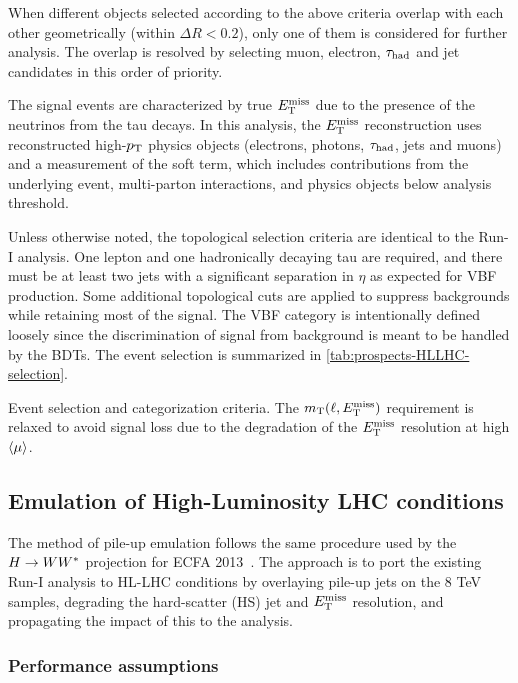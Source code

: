 When different objects selected according to the above criteria overlap with each other geometrically (within $\Delta R < 0.2$), only one of them is considered for further analysis. The overlap is resolved by selecting muon, electron, $\tau_\text{had}$ and jet candidates in this order of priority.

The signal events are characterized by true $E_{\mathrm{T}}^{\mathrm{miss}}$ due to the presence of the neutrinos from the tau decays. In this analysis, the $E_{\mathrm{T}}^{\mathrm{miss}}$ reconstruction uses reconstructed high-$p_{\mathrm{T}}$ physics objects (electrons, photons, $\tau_\text{had}$, jets and muons) and a measurement of the soft term, which includes contributions from the underlying event, multi-parton interactions, and physics objects below analysis threshold.

Unless otherwise noted, the topological selection criteria are identical to the Run-I analysis. One lepton and one hadronically decaying tau are required, and there must be at least two jets with a significant separation in $\eta$ as expected for VBF production. Some additional topological cuts are applied to suppress backgrounds while retaining most of the signal. The VBF category is intentionally defined loosely since the discrimination of signal from background is meant to be handled by the BDTs. The event selection is summarized in \cref{tab:prospects-HLLHC-selection}.

\begin{table}[!htpb]
  \centering
  \renewcommand{\arraystretch}{1.4}
  \caption{Event selection and categorization criteria. The $m_\text{T}(\ell, E_{\mathrm{T}}^{\mathrm{miss}})$ requirement is relaxed to avoid signal loss due to the degradation of the $E_{\mathrm{T}}^{\mathrm{miss}}$ resolution at high $\langle\mu\rangle$.}
  
  \label{tab:prospects-HLLHC-selection}
\end{table}

\subsection{Emulation of High-Luminosity LHC conditions}

The method of pile-up emulation follows the same procedure used by the $H\rightarrow WW^\ast$ projection for ECFA 2013~\cite{ATL-PHYS-PUB-2013-014}. The approach is to port the existing Run-I analysis to HL-LHC conditions by overlaying pile-up jets on the 8 TeV samples, degrading the hard-scatter (HS) jet and $E_{\mathrm{T}}^{\mathrm{miss}}$ resolution, and propagating the impact of this to the analysis.

\subsubsection{Performance assumptions}

